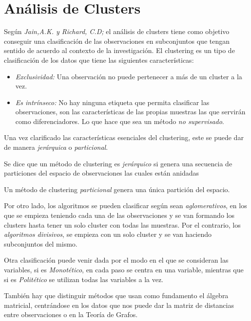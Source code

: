 \section{Análisis de Clusters}

\noindent Según \emph{Jain,A.K. y Richard, C.D; }\cite{Jain 1988} el análisis de clusters tiene como objetivo conseguir una clasificación de las observaciones en subconjuntos que tengan sentido de acuerdo al contexto de la investigación. El clustering es un tipo de clasificación de los datos que tiene las siguientes características:
\begin{itemize}
\item \textit{Exclusividad: }Una observación no puede pertenecer a más de un cluster a la vez. 
\item \textit{Es intrínseco: }No hay ninguna etiqueta que permita clasificar las observaciones, son las características de las propias muestras las que servirán como diferenciadores. Lo que hace que sea un método \textit{no supervisado}.
\end{itemize}

\noindent Una vez clarificado las características esenciales del clustering, este se puede dar de manera \emph{jerárquica} o \emph{particional}.

\begin{defi}
Se dice que un método de clustering es \emph{jerárquico} si genera una secuencia de particiones del espacio de observaciones las cuales están anidadas 
\end{defi}

\begin{defi}
Un método de clustering \emph{particional} genera una única partición del espacio. 
\end{defi}

\noindent Por otro lado, los algoritmos se pueden clasificar según  sean \textit{aglomerativos}, en los que se empieza teniendo cada una de las observaciones y se van formando los clusters hasta tener un solo cluster con todas las muestras. Por el contrario, los \textit{algoritmos   divisivos}, se empieza con un solo cluster y se van haciendo subconjuntos del mismo.  

\noindent Otra clasificación puede venir dada por el modo en el que se consideran las  variables, si es \textit{Monotético}, en cada paso se centra en una variable, mientras que si es \textit{Politético} se utilizan todas las variables a la vez.

\noindent También hay que distinguir métodos que usan como fundamento el álgebra matricial, centrándose en los datos que nos puede dar la matriz de distancias entre observaciones o en la Teoría de Grafos. 

